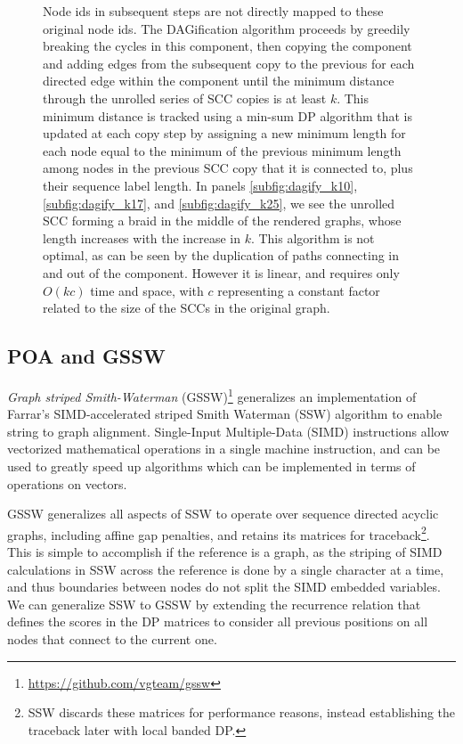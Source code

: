 \begin{figure}[htbp!]
{    Node ids in subsequent steps are not directly mapped to these original node ids.
    The DAGification algorithm proceeds by greedily breaking the cycles in this component, then copying the component and adding edges from the subsequent copy to the previous for each directed edge within the component until the minimum distance through the unrolled series of SCC copies is at least $k$.
    This minimum distance is tracked using a min-sum DP algorithm that is updated at each copy step by assigning a new minimum length for each node equal to the minimum of the previous minimum length among nodes in the previous SCC copy that it is connected to, plus their sequence label length.
    In panels \ref{subfig:dagify_k10}, \ref{subfig:dagify_k17}, and \ref{subfig:dagify_k25}, we see the unrolled SCC forming a braid in the middle of the rendered graphs, whose length increases with the increase in $k$.
    This algorithm is not optimal, as can be seen by the duplication of paths connecting in and out of the component.
    However it is linear, and requires only $O(kc)$ time and space, with $c$ representing a constant factor related to the size of the SCCs in the original graph.
  }
\label{fig:dagify}
\end{figure}

\subsection{POA and GSSW}
\label{sec:gssw}

\emph{Graph striped Smith-Waterman} (GSSW)\footnote{\url{https://github.com/vgteam/gssw}} generalizes an implementation \cite{zhao2013ssw} of Farrar's SIMD-accelerated striped Smith Waterman (SSW) algorithm \cite{farrar2007striped} to enable string to graph alignment.
Single-Input Multiple-Data (SIMD) instructions allow vectorized mathematical operations in a single machine instruction, and can be used to greatly speed up algorithms which can be implemented in terms of operations on vectors.

GSSW generalizes all aspects of SSW to operate over sequence directed acyclic graphs, including affine gap penalties, and retains its matrices for traceback\footnote{SSW discards these matrices for performance reasons, instead establishing the traceback later with local banded DP.}.
This is simple to accomplish if the reference is a graph, as the striping of SIMD calculations in SSW across the reference is done by a single character at a time, and thus boundaries between nodes do not split the SIMD embedded variables.
We can generalize SSW to GSSW by extending the recurrence relation that defines the scores in the DP matrices to consider all previous positions on all nodes that connect to the current one.

